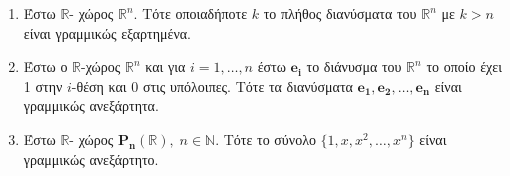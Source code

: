 \documentclass[a4paper,table]{report}
\begin{document}
\begin{examples}
\item {}
  \begin{enumerate}
    \item 
      Έστω $ \mathbb{R} $- χώρος $ \mathbb{R}^{n} $. Τότε οποιαδήποτε $ k $ 
      το πλήθος διανύσματα του $ \mathbb{R}^{n} $ με $ k >n $ είναι 
      γραμμικώς εξαρτημένα. 

    \item Έστω ο $ \mathbb{R} $-χώρος $ \mathbb{R}^{n} $ και για $ i= 1,\ldots,n $
      έστω $ \mathbf{e_{i}} $ το διάνυσμα του $ \mathbb{R}^{n} $ το οποίο έχει 
      1 στην $ i $-θέση και 0 στις υπόλοιπες. Τότε τα διανύσματα 
      $ \mathbf{e_{1}}, \mathbf{e_{2}}, \ldots, \mathbf{e_{n}} $ είναι 
      γραμμικώς ανεξάρτητα. 

    \item Έστω $ \mathbb{R} $- χώρος $ \mathbf{P_{n}}(\mathbb{R}), \; n 
      \in \mathbb{N} $. Τότε το σύνολο $ \{1,x,x^{2}, \ldots,x^{n} \} $ 
      είναι γραμμικώς ανεξάρτητο. 
  \end{enumerate}
\end{examples}
\end{document}
